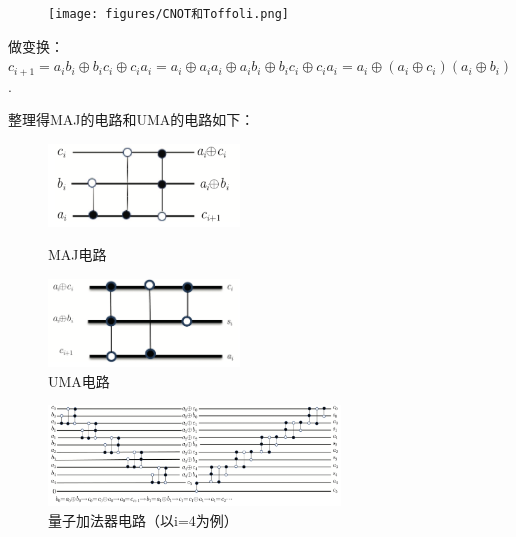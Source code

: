 \documentclass[12pt,hyperref,a4paper,UTF8]{ctexart}
\begin{document}
\begin{figure}[!htbp]     
    \centering     
    \texttt{[image: figures/CNOT和Toffoli.png]}     
\end{figure}

做变换：$c_{i+1}  =a_i b_i \oplus b_i c_i \oplus c_i a_i =a_i \oplus a_i a_i \oplus a_i b_i \oplus b_i c_i \oplus c_i a_i  =a_i \oplus\left(a_i \oplus c_i\right)\left(a_i \oplus b_i\right)$.

\noindent
整理得MAJ的电路和UMA的电路如下：

\begin{figure}[!htbp]
	\begin{minipage}{0.5\linewidth}
		\centering
		\includegraphics[width=2in]{figures/MAJ门电路.png}
		\caption{MAJ电路}
	\end{minipage}
	\begin{minipage}{0.5\linewidth}
		\centering
		\includegraphics[width=2in]{figures/UMA门电路.png}
		\caption{UMA电路}
	\end{minipage}
\end{figure}
\begin{figure}[!htbp]     
    \centering     
    \includegraphics[width =0.69\textwidth]{figures/加法器电路.png}     
    \caption{量子加法器电路（以i=4为例）}
\end{figure}

\newpage
\end{document}

